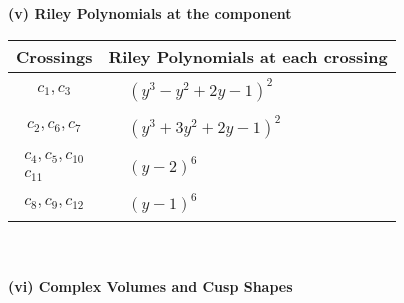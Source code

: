 \documentclass[1p]{elsarticle_modified}
\theoremstyle{definition}
\begin{document}
\newpage\renewcommand{\arraystretch}{1}
\flushleft \textbf{(v) Riley Polynomials at the component}\newline \\
\begin{tabular}{m{50pt}|m{274pt}}
Crossings & \hspace{64pt}Riley Polynomials at each crossing \\
\hline $$\begin{aligned}c_{1},c_{3}\end{aligned}$$&$\begin{aligned}
&(y^3- y^2+2 y-1)^2
\end{aligned}$\\
\hline $$\begin{aligned}c_{2},c_{6},c_{7}\end{aligned}$$&$\begin{aligned}
&(y^3+3 y^2+2 y-1)^2
\end{aligned}$\\
\hline $$\begin{aligned}c_{4},c_{5},c_{10}\\c_{11}\end{aligned}$$&$\begin{aligned}
&(y-2)^6
\end{aligned}$\\
\hline $$\begin{aligned}c_{8},c_{9},c_{12}\end{aligned}$$&$\begin{aligned}
&(y-1)^6
\end{aligned}$\\
\hline
\end{tabular}\\~\\
\newpage\flushleft \textbf{(vi) Complex Volumes and Cusp Shapes}
\end{document}
